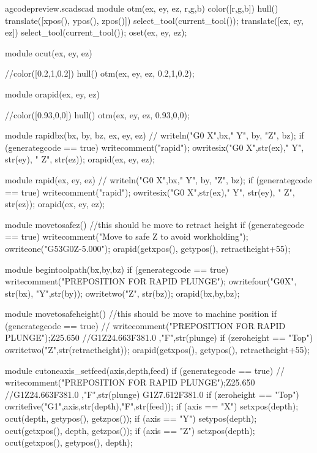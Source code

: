 \documentclass{ltxdoc}
\begin{document}
\addtocounter{gcpy}{101}

%

\lstset{firstnumber=\thegcpscad}
\begin{writecode}{a}{gcodepreview.scad}{scad}
module otm(ex, ey, ez, r,g,b) {
color([r,g,b]) hull(){
    translate([xpos(), ypos(), zpos()]){
      select_tool(current_tool());
    }
    translate([ex, ey, ez]){
      select_tool(current_tool());
    }
  }
oset(ex, ey, ez);
}

module ocut(ex, ey, ez) {
  //color([0.2,1,0.2]) hull(){
  otm(ex, ey, ez, 0.2,1,0.2);
}

module orapid(ex, ey, ez) {
  //color([0.93,0,0]) hull(){
  otm(ex, ey, ez, 0.93,0,0);
}

module rapidbx(bx, by, bz, ex, ey, ez) {
  //    writeln("G0 X",bx," Y", by, "Z", bz);
  if (generategcode == true) {
    writecomment("rapid");
    owritesix("G0 X",str(ex)," Y", str(ey), " Z", str(ez));
  }
    orapid(ex, ey, ez);
}

module rapid(ex, ey, ez) {
  //    writeln("G0 X",bx," Y", by, "Z", bz);
  if (generategcode == true) {
      writecomment("rapid");
      owritesix("G0 X",str(ex)," Y", str(ey), " Z", str(ez));
  }
  orapid(ex, ey, ez);
}

module movetosafez() {
  //this should be move to retract height
  if (generategcode == true) {
      writecomment("Move to safe Z to avoid workholding");
      owriteone("G53G0Z-5.000");
  }
  orapid(getxpos(), getypos(), retractheight+55);
}

module begintoolpath(bx,by,bz) {
  if (generategcode == true) {
    writecomment("PREPOSITION FOR RAPID PLUNGE");
    owritefour("G0X", str(bx), "Y",str(by));
    owritetwo("Z", str(bz));
  }
  orapid(bx,by,bz);
}

module movetosafeheight() {
  //this should be move to machine position
  if (generategcode == true) {
  //    writecomment("PREPOSITION FOR RAPID PLUNGE");Z25.650
  //G1Z24.663F381.0 ,"F",str(plunge)
    if (zeroheight == "Top") {
      owritetwo("Z",str(retractheight));
    }
  }
    orapid(getxpos(), getypos(), retractheight+55);
}

module cutoneaxis_setfeed(axis,depth,feed) {
  if (generategcode == true) {
  //    writecomment("PREPOSITION FOR RAPID PLUNGE");Z25.650
  //G1Z24.663F381.0 ,"F",str(plunge) G1Z7.612F381.0
    if (zeroheight == "Top") {
      owritefive("G1",axis,str(depth),"F",str(feed));
    }
  }
  if (axis == "X") {setxpos(depth);
    ocut(depth, getypos(), getzpos());}
    if (axis == "Y") {setypos(depth);
      ocut(getxpos(), depth, getzpos());
    }
      if (axis == "Z") {setzpos(depth);
        ocut(getxpos(), getypos(), depth);
      }
}

}}
\end{writecode}
\end{document}
